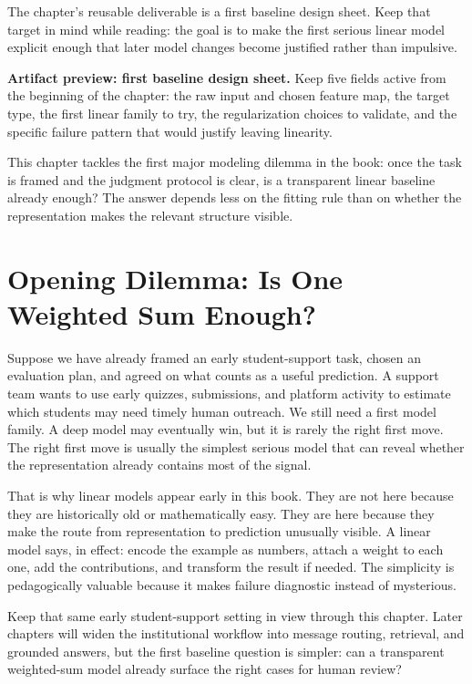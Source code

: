 The chapter's reusable deliverable is a first baseline design sheet. Keep that target in mind while reading: the goal is to make the first serious linear model explicit enough that later model changes become justified rather than impulsive.

\begin{thinkingtool}
\textbf{Artifact preview: first baseline design sheet.} Keep five fields active from the beginning of the chapter: the raw input and chosen feature map, the target type, the first linear family to try, the regularization choices to validate, and the specific failure pattern that would justify leaving linearity.
\end{thinkingtool}

\begin{problemsolvinglens}
This chapter tackles the first major modeling dilemma in the book: once the task is framed and the judgment protocol is clear, is a transparent linear baseline already enough? The answer depends less on the fitting rule than on whether the representation makes the relevant structure visible.
\end{problemsolvinglens}

\section{Opening Dilemma: Is One Weighted Sum Enough?}

Suppose we have already framed an early student-support task, chosen an evaluation plan, and agreed on what counts as a useful prediction. A support team wants to use early quizzes, submissions, and platform activity to estimate which students may need timely human outreach. We still need a first model family. A deep model may eventually win, but it is rarely the right first move. The right first move is usually the simplest serious model that can reveal whether the representation already contains most of the signal.

That is why linear models appear early in this book. They are not here because they are historically old or mathematically easy. They are here because they make the route from representation to prediction unusually visible. A linear model says, in effect: encode the example as numbers, attach a weight to each one, add the contributions, and transform the result if needed. The simplicity is pedagogically valuable because it makes failure diagnostic instead of mysterious.

Keep that same early student-support setting in view through this chapter. Later chapters will widen the institutional workflow into message routing, retrieval, and grounded answers, but the first baseline question is simpler: can a transparent weighted-sum model already surface the right cases for human review?

